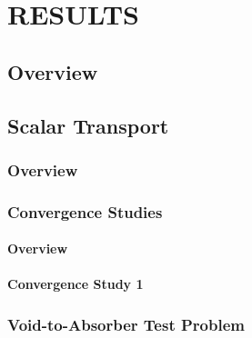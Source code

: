 \chapter{RESULTS}

\section{Overview}
  
\section{Scalar Transport\label{sec:transport_results}}
\subsection{Overview}
  
\subsection{Convergence Studies\label{sec:convergence}}
  \subsubsection{Overview\label{sec:convergence_overview}}
    
  \subsubsection{Convergence Study 1\label{sec:mms_sinx_ss}}
    
\subsection{Void-to-Absorber Test Problem\label{sec:void_to_absorber}}
  
